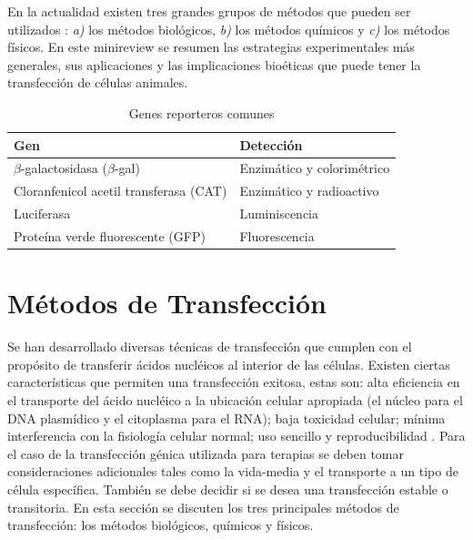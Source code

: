 \documentclass[fleqn,10pt]{SelfArx} %
\begin{document}
En la actualidad existen tres grandes grupos de métodos que pueden ser utilizados \cite{Kim:2010aa}: \textit{a)} los métodos biológicos, \textit{b)} los métodos químicos y \textit{c)} los métodos físicos. En este minireview se resumen las estrategias experimentales más generales, sus aplicaciones y las implicaciones bioéticas que puede tener la transfección de células animales.

\begin{table}[th!]
\centering
\begin{tabular}{p{8cm} p{4cm}} \toprule
\textbf{Gen} & \textbf{Detección} \\ \hline
$\beta$-galactosidasa ($\beta$-gal) & Enzimático y colorimétrico \\ 
Cloranfenicol acetil transferasa (CAT) & Enzimático y radioactivo \\
Luciferasa & Luminiscencia \\
Proteína verde fluorescente (GFP) & Fluorescencia \\ \bottomrule
\end{tabular}
\caption{Genes reporteros comunes}
\label{Tab:reportero}
\end{table}

\section{Métodos de Transfección}
Se han desarrollado diversas técnicas de transfección que cumplen con el propósito de transferir ácidos nucléicos al interior de las células. Existen ciertas características que permiten una transfección exitosa, estas son: alta eficiencia en el transporte del ácido nucléico a la ubicación celular apropiada (el núcleo para el DNA plasmídico y el citoplasma para el RNA); baja toxicidad celular; mínima interferencia con la fisiología celular normal; uso sencillo y reproducibilidad \cite{Schenborn}. Para el caso de la transfección génica utilizada para terapias se deben tomar consideraciones adicionales tales como la vida-media y el transporte a un tipo de célula específica. También se debe decidir si se desea una transfección estable o transitoria.  En esta sección se discuten los tres principales métodos de transfección: los métodos biológicos, químicos y físicos.
\end{document}
